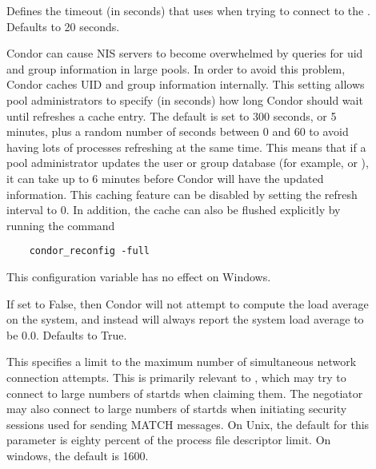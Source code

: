 \begin{description}
\item[] \label{param:QQueryTimeout}
  Defines the timeout (in seconds) that  uses when trying to
  connect to the .  Defaults to 20 seconds.
\item[]
  \label{param:PasswdCacheRefresh}
  Condor can cause NIS servers to become overwhelmed by queries for uid
  and group information in large pools. In order to avoid this problem,
  Condor caches UID and group information internally. This setting allows
  pool administrators to specify (in seconds) how long Condor should wait
  until refreshes a cache entry. The default is set to 300 seconds, or
  5 minutes, plus a random number of seconds between 0 and 60 to avoid
  having lots of processes refreshing at the same time.
  This means that if a pool administrator updates the user
  or group database (for example,  or ),
  it can take up
  to 6 minutes before Condor will have the updated information. This
  caching feature can be disabled by setting the refresh interval to
  0. In addition, the cache can also be flushed explicitly by running
  the command
  \begin{verbatim}
    condor_reconfig -full
  \end{verbatim}
  This configuration variable has no effect on Windows.
\item[] \label{param:SysapiGetLoadavg}
  If set to False, then Condor will not attempt to compute the load average
  on the system, and instead will always report the system load average
  to be 0.0.  Defaults to True.

\item[] \label{param:NetworkMaxPendingConnects}
  This specifies a limit to the maximum number of simultaneous network
  connection attempts.  This is primarily relevant to ,
  which may try to connect to large numbers of startds when claiming
  them.  The negotiator may also connect to large numbers of startds
  when initiating security sessions used for sending MATCH messages.  On
  Unix, the default for this parameter is eighty percent of the process file
  descriptor limit.  On windows, the default is 1600.

\end{description}


